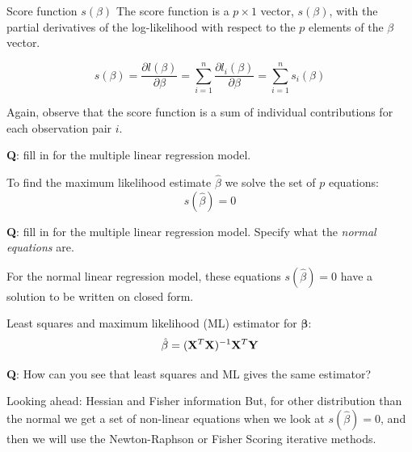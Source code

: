 \documentclass[
  ignorenonframetext,
]{beamer}
\begin{document}
\begin{frame}
\begin{block}{Score function \(s(\beta)\)}
\label{score-function-sbeta}
The score function is a \(p\times 1\) vector, \(s(\beta)\), with the
partial derivatives of the log-likelihood with respect to the \(p\)
elements of the \(\beta\) vector.

\[
s(\beta)=\frac{\partial l(\beta)}{\partial \beta}=
\sum_{i=1}^n \frac{\partial l_i(\beta)}{\partial \beta}=
\sum_{i=1}^n s_i(\beta)
\]

Again, observe that the score function is a sum of individual
contributions for each observation pair \(i\).

\textbf{Q}: fill in for the multiple linear regression model.
\end{block}
\end{frame}

\begin{frame}
To find the maximum likelihood estimate \(\hat{\beta}\) we solve the set
of \(p\) equations: \[s(\hat{\beta})=0\]
\end{frame}

\begin{frame}
\textbf{Q}: fill in for the multiple linear regression model. Specify
what the \emph{normal equations} are.

For the normal linear regression model, these equations
\(s(\hat{\beta})=0\) have a solution to be written on closed form.
\end{frame}

\begin{frame}
\begin{block}{Least squares and maximum likelihood (ML) estimator for
\({\boldsymbol \beta}\):}
\label{least-squares-and-maximum-likelihood-ml-estimator-for-boldsymbol-beta}
\[
\hat\beta=({\bf X}^T{\bf X})^{-1} {\bf X}^T {\bf Y}
\]

\textbf{Q}: How can you see that least squares and ML gives the same
estimator?
\end{block}
\end{frame}

\begin{frame}
\begin{block}{Looking ahead: Hessian and Fisher information}
\label{looking-ahead-hessian-and-fisher-information}
But, for other distribution than the normal we get a set of non-linear
equations when we look at \(s(\hat{\beta})=0\), and then we will use the
Newton-Raphson or Fisher Scoring iterative methods.
\end{block}
\end{frame}
\end{document}
